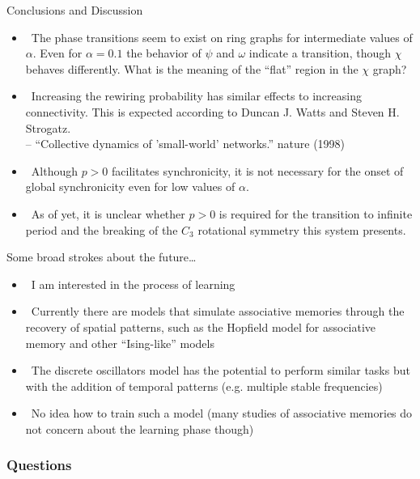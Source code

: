 \documentclass[serif,mathserif]{beamer}
\begin{document}
\begin{frame}{Conclusions and Discussion}
    \begin{itemize}
        \item \ \pause The phase transitions seem to exist on ring graphs for intermediate values of $\alpha$. Even for $\alpha=0.1$ the behavior of $\psi$ and $\omega$ indicate a transition, though $\chi$ behaves differently. What is the meaning of the ``flat'' region in the $\chi$ graph?
        \vspace{0.1cm}
        \item \ \pause Increasing the rewiring probability has similar effects to increasing connectivity. This is expected according to Duncan J. Watts and Steven H. Strogatz.\\
            \hfill -- ``Collective dynamics of 'small-world' networks.'' nature (1998)
        \vspace{0.1cm}
        \item \ \pause Although $p>0$ facilitates synchronicity, it is not necessary for the onset of global synchronicity even for low values of $\alpha$.
        \vspace{0.1cm}
    \item \ \pause As of yet, it is unclear whether $p>0$ is required for the transition to infinite period and the breaking of the $C_3$ rotational symmetry this system presents.
    \end{itemize}
\end{frame}

\begin{frame}{Some broad strokes about the future\dots}
    \begin{itemize}
        \item \ \pause I am interested in the process of learning
        \item \ \pause Currently there are models that simulate associative memories through the recovery of spatial patterns, such as the Hopfield model for associative memory and other ``Ising-like'' models
        \item \ \pause The discrete oscillators model has the potential to perform similar tasks but with the addition of temporal patterns (e.g. multiple stable frequencies)
        \item \ \pause No idea how to train such a model (many studies of associative memories do not concern about the learning phase though)
    \end{itemize}
\end{frame}

\begin{frame}
  \frametitle{Questions}
\end{frame}
\end{document}
